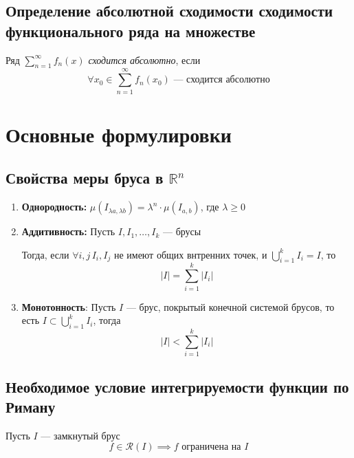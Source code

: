 \documentclass[a4paper]{article}
\begin{document}
\subsection{Определение абсолютной сходимости сходимости функционального ряда на множестве}
 Ряд $\sum_{n=1}^{\infty}f_n(x)$ \textit{сходится абсолютно}, если
\begin{equation*}
    \forall x_0\in \sum_{n=1}^{\infty}f_n(x_0)\text{ — сходится абсолютно}
\end{equation*}


\newpage
\section{Основные формулировки}
\subsection{Свойства меры бруса в $\mathbb{R}^n$}
\begin{enumerate}
    \item \textbf{Однородность:} $\mu(I_{\lambda a,\lambda b})=\lambda^n\cdot\mu(I_{a,b})$, где $\lambda\geqslant
    0$
    \item \textbf{Аддитивность:} Пусть $I, I_1, \ldots, I_k$ — брусы
    
    Тогда, если $\forall i, j\, I_i, I_j$ не имеют общих внтренних точек, и $\displaystyle\bigcup_{i=1}^kI_i = I$, то
    \begin{equation*}
        |I| = \sum_{i=1}^k|I_i|
    \end{equation*}
    \item \textbf{Монотонность}: Пусть $I$ — брус, покрытый конечной системой брусов, то есть $I\subset \displaystyle\bigcup_{i=1}^kI_i$, тогда
    \begin{equation*}
        |I| < \sum_{i=1}^k|I_i|
    \end{equation*}
\end{enumerate}

\subsection{Необходимое условие интегрируемости функции по Риману}
\theorem Пусть $I$ — замкнутый брус
\begin{equation*}
    f\in \mathcal{R}(I) \implies f \text{ ограничена на } I
\end{equation*}
\end{document}
